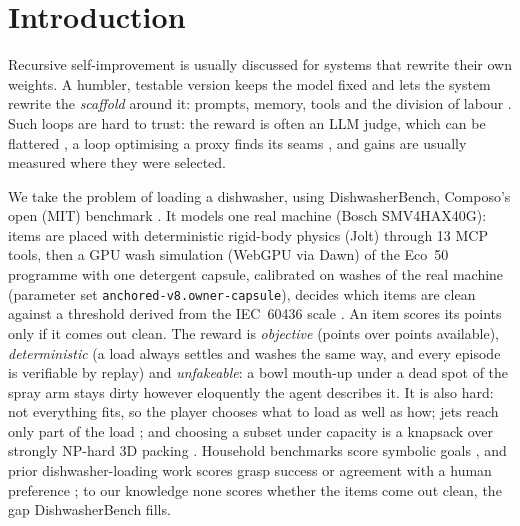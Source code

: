 \documentclass[9pt,twocolumn,letterpaper]{extarticle}
\begin{document}
\section{Introduction}
Recursive self-improvement is usually discussed for systems that rewrite their own weights. A
humbler, testable version keeps the model fixed and lets the system rewrite the \emph{scaffold}
around it: prompts, memory, tools and the division of labour
\citep{zelikman2023stop,hu2024adas,zhang2025dgm}. Such loops are hard to trust: the reward is often an LLM judge, which can be flattered
\citep{zheng2023judge}, a loop optimising a proxy finds its seams
\citep{skalse2022rewardhacking,krakovna2020specgaming,manheim2018goodhart}, and gains are usually
measured where they were selected.

We take the problem of loading a dishwasher, using DishwasherBench, Composo's open (MIT) benchmark
\citep{composo2026dishwasherbench}. It models one real machine (Bosch SMV4HAX40G): items are placed
with deterministic rigid-body physics (Jolt) through 13 MCP tools, then a GPU wash simulation
(WebGPU via Dawn) of the Eco~50 programme with one detergent capsule, calibrated on washes of the
real machine (parameter set \texttt{anchored-v8.owner-capsule}), decides which items are clean
against a threshold derived from the IEC~60436 scale \citep{iec60436_2025,en60436_2020,eilts2023roundrobin}.
An item scores its points only if it comes out clean. The reward is \emph{objective} (points over
points available), \emph{deterministic} (a load always settles and washes the same way, and every
episode is verifiable by replay) and \emph{unfakeable}: a bowl mouth-up under a dead spot of the
spray arm stays dirty however eloquently the agent describes it. It is also hard: not everything
fits, so the player chooses what to load as well as how; jets reach only part of the load
\citep{perezmohedano2015pept,perezmohedano2017integrated}; and choosing a subset under capacity is
a knapsack over strongly NP-hard 3D packing \citep{kellerer2004knapsack,martello2000threedim}.
Household benchmarks score symbolic goals
\citep{srivastava2021behavior,shridhar2020alfred,puig2018virtualhome,savva2019habitat}, and prior
dishwasher-loading work scores grasp success or agreement with a human preference
\citep{voysey2021dishwasher,jain2023transformers,kapelyukh2021myhouse,lin2021gnn}; to our knowledge
none scores whether the items come out clean, the gap DishwasherBench fills.
\end{document}

